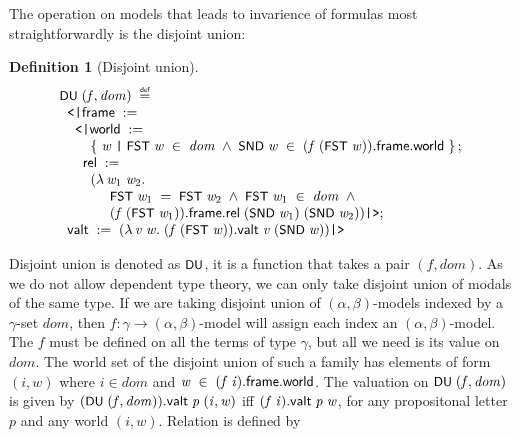 \documentclass[letterpaper]{article}
\newtheorem{defn}{Definition}
\renewcommand{\HOLConst}[1]{{\textsf{\upshape\small #1}}}
\renewcommand{\HOLinline}[1]{\ensuremath{#1}}
\newenvironment{holmath}{\begin{displaymath}\begin{array}{l}}{\end{array}\end{displaymath}\ignorespacesafterend}
\begin{document}
The operation on models that leads to invarience of formulas most straightforwardly is the disjoint union:
\begin{defn}[Disjoint union]
\begin{holmath}
   \HOLConst{DU}\;(\HOLFreeVar{f}\HOLSymConst{,}\HOLFreeVar{dom})\;\HOLSymConst{\HOLTokenDefEquality{}}\\
\;\;\HOLTokenLeftrec{}\HOLFieldName{frame}\;:=\\
\;\;\;\;\HOLTokenLeftrec{}\HOLFieldName{world}\;:=\\
\;\;\;\;\;\;\;\;\HOLTokenLeftbrace{}\HOLBoundVar{w}\;\HOLTokenBar{}\;\HOLConst{FST}\;\HOLBoundVar{w}\;\HOLSymConst{\HOLTokenIn{}}\;\HOLFreeVar{dom}\;\HOLSymConst{\HOLTokenConj{}}\;\HOLConst{SND}\;\HOLBoundVar{w}\;\HOLSymConst{\HOLTokenIn{}}\;(\HOLFreeVar{f}\;(\HOLConst{FST}\;\HOLBoundVar{w})).\HOLFieldName{frame}.\HOLFieldName{world}\HOLTokenRightbrace{};\\
\;\;\;\;\;\;\HOLFieldName{rel}\;:=\\
\;\;\;\;\;\;\;\;(\HOLTokenLambda{}\HOLBoundVar{w\sb{\mathrm{1}}}\;\HOLBoundVar{w\sb{\mathrm{2}}}.\\
\;\;\;\;\;\;\;\;\;\;\;\;\;\HOLConst{FST}\;\HOLBoundVar{w\sb{\mathrm{1}}}\;\HOLSymConst{=}\;\HOLConst{FST}\;\HOLBoundVar{w\sb{\mathrm{2}}}\;\HOLSymConst{\HOLTokenConj{}}\;\HOLConst{FST}\;\HOLBoundVar{w\sb{\mathrm{1}}}\;\HOLSymConst{\HOLTokenIn{}}\;\HOLFreeVar{dom}\;\HOLSymConst{\HOLTokenConj{}}\\
\;\;\;\;\;\;\;\;\;\;\;\;\;(\HOLFreeVar{f}\;(\HOLConst{FST}\;\HOLBoundVar{w\sb{\mathrm{1}}})).\HOLFieldName{frame}.\HOLFieldName{rel}\;(\HOLConst{SND}\;\HOLBoundVar{w\sb{\mathrm{1}}})\;(\HOLConst{SND}\;\HOLBoundVar{w\sb{\mathrm{2}}}))\HOLTokenRightrec{};\\
\;\;\HOLFieldName{valt}\;:=\;(\HOLTokenLambda{}\HOLBoundVar{v}\;\HOLBoundVar{w}.\;(\HOLFreeVar{f}\;(\HOLConst{FST}\;\HOLBoundVar{w})).\HOLFieldName{valt}\;\HOLBoundVar{v}\;(\HOLConst{SND}\;\HOLBoundVar{w}))\HOLTokenRightrec{}
\end{holmath} 
\end{defn}
Disjoint union is denoted as \HOLinline{\HOLConst{DU}}, it is a function that takes a pair $(f,dom)$. As we do not allow dependent type theory, we can only take disjoint union of modals of the same type. If we are taking disjoint union of $(\alpha,\beta)$-models indexed by a $\gamma$-set $dom$, then $f:\gamma\to (\alpha,\beta)$-model will assign each index an $(\alpha,\beta)$-model. The $f$ must be defined on all the terms of type $\gamma$, but all we need is its value on $dom$. The world set of the disjoint union of such a family has elements of form $(i,w)$ where $i\in dom$ and \HOLinline{\HOLFreeVar{w}\;\HOLSymConst{\HOLTokenIn{}}\;(\HOLFreeVar{f}\;\HOLFreeVar{i}).\HOLFieldName{frame}.\HOLFieldName{world}}. The valuation on \HOLinline{\HOLConst{DU}\;(\HOLFreeVar{f}\HOLSymConst{,}\HOLFreeVar{dom})} is given by \HOLinline{(\HOLConst{DU}\;(\HOLFreeVar{f}\HOLSymConst{,}\HOLFreeVar{dom})).\HOLFieldName{valt}\;\HOLFreeVar{p}\;(\HOLFreeVar{i}\HOLSymConst{,}\HOLFreeVar{w})} iff \HOLinline{(\HOLFreeVar{f}\;\HOLFreeVar{i}).\HOLFieldName{valt}\;\HOLFreeVar{p}\;\HOLFreeVar{w}}, for any propositonal letter $p$ and any world $(i,w)$. Relation is defined by
\end{document}
